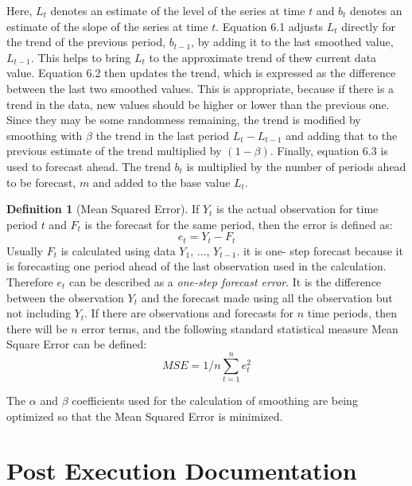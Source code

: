 \documentclass[a4paper,11pt,twoside]{report}
\theoremstyle{definition}
\newtheorem{definition}[theorem]{Definition}
\begin{document}
Here, $L_t$ denotes an estimate of the level of the series at time $t$ and $b_t$ denotes an estimate of the slope of the series at time $t$. Equation 6.1 adjusts $L_t$ directly for the trend of the previous period, $b_{t-1}$, by adding it to the last smoothed value, $L_{t-1}$. This helps to bring $L_t$ to the approximate trend of thew current data value. Equation 6.2 then updates the trend, which is expressed as the difference between the last two smoothed values. This is appropriate, because if there is a trend in the data, new values should be higher or lower than the previous one. Since they may be some randomness remaining, the trend is modified by smoothing with $\beta$ the trend in the last period $L_t - L_{t-1}$ and adding that to the previous estimate of the trend multiplied by $ (1 - \beta)$. Finally, equation 6.3 is used to forecast ahead. The trend $b_t$ is multiplied by the number of periods ahead to be forecast, $m$ and added to the base value $L_t$.
\begin{definition}[Mean Squared Error]
If $Y_t$ is the actual observation for time period $t$ and $F_t$ is the forecast for the same period, then the error is defined as:
\begin{equation}\label{Error}
e_t = Y_t - F_t
\end{equation}
Usually $F_t$ is calculated using data $Y_1$, ..., $Y_{t-1}$. it is one- step forecast because it is forecasting one period ahead of the last observation used in the calculation. Therefore $e_t$ can be described as a \textit{one-step forecast error}. It is the difference between the observation $Y_t$ and the forecast made using all the observation but not including $Y_t$. 
If there are observations and forecasts for $n$ time periods, then there will be $n$ error terms, and the following standard statistical measure Mean Square Error can be defined:
\begin{equation}\label{Mean Squared Error}
MSE = 1/n \sum_{t=1}^{n} e_t^{2} 
\end{equation} \cite{L}

\end{definition}
The $\alpha$ and $\beta$ coefficients used for the calculation of smoothing are being optimized so that the Mean Squared Error is minimized.




\chapter{Post Execution Documentation}
\end{document}
